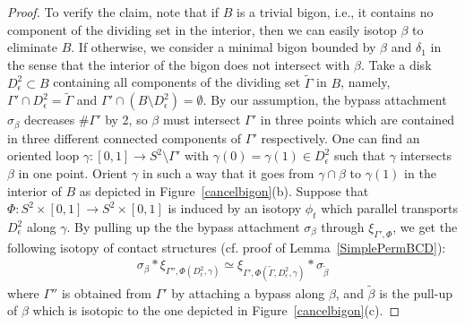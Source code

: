 \documentclass[12pt]{amsart}
\theoremstyle{remark}
\begin{document}
\begin{proof}
To verify the claim, note that if $B$ is a trivial bigon, i.e., it contains no component of the dividing set in the interior, then we can easily isotop $\beta$ to eliminate $B$. If otherwise, we consider a minimal bigon bounded by $\beta$ and $\delta_1$ in the sense that the interior of the bigon does not intersect with $\beta$. Take a disk $D^2_\epsilon \subset B$ containing all components of the dividing set $\tilde\Gamma$ in $B$, namely, $\Gamma' \cap D^2_\epsilon=\tilde\Gamma$ and $\Gamma'\cap(B \setminus D^2_\epsilon)=\emptyset$. By our assumption, the bypass attachment $\sigma_\beta$ decreases $\#\Gamma'$ by 2, so $\beta$ must intersect $\Gamma'$ in three points which are contained in three different connected components of $\Gamma'$ respectively. One can find an oriented loop $\gamma:[0,1] \to S^2\setminus\Gamma'$ with $\gamma(0)=\gamma(1) \in D^2_\epsilon$ such that $\gamma$ intersects $\beta$ in one point. Orient $\gamma$ in such a way that it goes from $\gamma\cap\beta$ to $\gamma(1)$ in the interior of $B$ as depicted in Figure~\ref{cancelbigon}(b). Suppose that $\Phi:S^2\times[0,1] \to S^2\times[0,1]$ is induced by an isotopy $\phi_t$ which parallel transports $D^2_\epsilon$ along $\gamma$. By pulling up the the bypass attachment $\sigma_\beta$ through $\xi_{\Gamma',\Phi}$, we get the following isotopy of contact structures (cf. proof of Lemma~\ref{SimplePermBCD}):
\begin{align*}
\sigma_\beta \ast \xi_{\Gamma'',\Phi(D^2_\epsilon,\gamma)} \simeq \xi_{\Gamma',\Phi(\tilde\Gamma,D^2_\epsilon,\gamma)} \ast \sigma_{\tilde\beta}
\end{align*}
where $\Gamma''$ is obtained from $\Gamma'$ by attaching a bypass along $\beta$, and $\tilde\beta$ is the pull-up of $\beta$ which is isotopic to the one depicted in Figure~\ref{cancelbigon}(c).


\end{proof}
\end{document}

